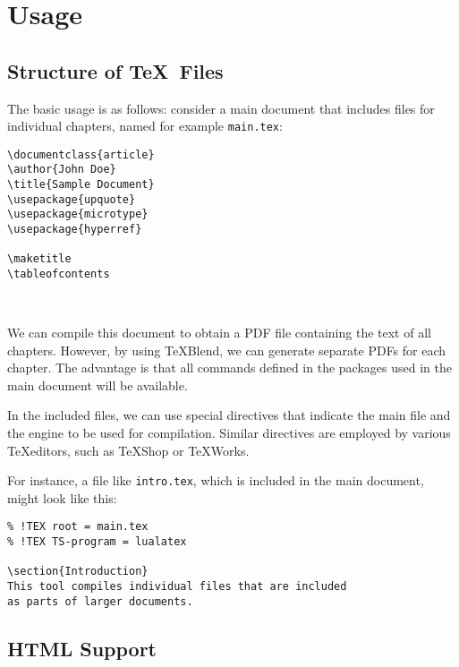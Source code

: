 \section{Usage}

\subsection{Structure of \TeX\ Files}

The basic usage is as follows: consider a main document that includes files for
individual chapters, named for example \texttt{main.tex}:


\begin{verbatim}
\documentclass{article}
\author{John Doe}
\title{Sample Document}
\usepackage{upquote}
\usepackage{microtype}
\usepackage{hyperref}

\maketitle
\tableofcontents



\end{verbatim}

We can compile this document to obtain a PDF file containing the text of all
chapters. However, by using \TeX Blend, we can generate separate PDFs for each
chapter. The advantage is that all commands defined in the packages used in the
main document will be available.

In the included files, we can use special directives that indicate the main
file and the engine to be used for compilation. Similar directives are employed
by various \TeX editors, such as \TeX Shop or \TeX Works.

For instance, a file like \texttt{intro.tex}, which is included in the main document,
might look like this:

\begin{verbatim}
% !TEX root = main.tex
% !TEX TS-program = lualatex

\section{Introduction}
This tool compiles individual files that are included 
as parts of larger documents. 
\end{verbatim}



\subsection{HTML Support}

